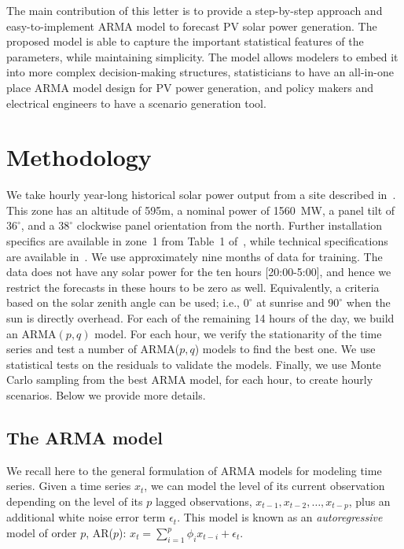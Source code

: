 \documentclass[letter]{IEEEtran}
\begin{document}
The main contribution of this letter is to provide a step-by-step approach and 
easy-to-implement ARMA model to forecast PV solar power generation. The 
proposed model is able to capture the important statistical features of the 
parameters, while maintaining simplicity. The model allows modelers to embed
it into more complex decision-making structures, statisticians to have an 
all-in-one place ARMA model design for PV power generation, and policy makers and electrical engineers to have a scenario generation tool. 

\section{Methodology} \label{sec:methodology}

We take hourly year-long historical solar power output 
from a site described in~\cite{golestaneh2016generation}. 
This zone has an altitude of 595m, a nominal power of 1560~MW, a panel 
tilt 
of $36^\circ$, and a $38^\circ$ clockwise panel orientation from the north. 
Further installation specifics are available in zone~1 from Table~1 
of~\cite{golestaneh2016generation}, while technical specifications are 
available 
in~\cite{technical}.  We use approximately nine months of data 
for training. The data does not have any solar power for the ten hours 
[20:00-5:00], and hence we restrict the forecasts in these hours to be zero as 
well. Equivalently, a criteria based on the solar zenith angle can be used; 
i.e., $0^\circ$ at sunrise and $90^\circ$ when the sun is directly overhead. 
For 
each of the remaining 14 hours of the day, we build an ARMA$(p,q)$ 
model. 
For each hour, we verify the stationarity of the time 
series and test a number of ARMA($p,q$) models to find the best 
one. We use statistical tests on the residuals to validate the models. Finally, 
we use Monte Carlo sampling from the best ARMA model, for each hour, to create 
hourly scenarios. Below we provide more details.

\subsection{The ARMA model} \label{sec:arma}

We recall here to the general formulation of  ARMA models for modeling time 
series.  Given a time series $x_t$, we can model the level of its current 
observation depending on the level of its $p$ lagged observations, 
$x_{t-1},x_{t-2}, \ldots, x_{t-p}$, plus an additional white noise error term 
$\epsilon_t$. This model is known as an \textit{autoregressive} model of order 
${p}$, AR($p$): $x_t = \sum_{i=1}^p  \phi_i x_{t-i}   + \epsilon_t$.
\end{document}
